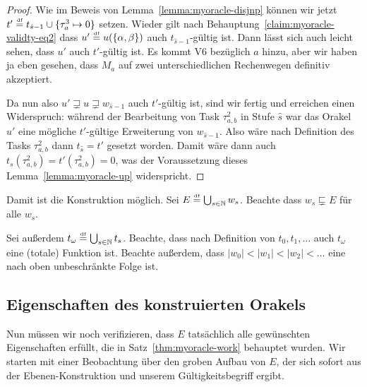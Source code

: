 \begin{proof}
Wie im Beweis von Lemma~\ref{lemma:myoracle-disjnp} können wir jetzt $t'\stackrel{\text{\smash{\tiny df}}}{=} t_{\hat{s}-1}\cup\{\tau^3_{a} \mapsto 0\}$ setzen.
Wieder gilt nach Behauptung~\ref{claim:myoracle-validty-eq2} dass $u'\stackrel{\text{\smash{\tiny df}}}{=} u(\{\alpha, \beta\})$ auch $t_{\hat{s}-1}$-gültig ist.
Dann lässt sich auch leicht sehen, dass $u'$ auch $t'$-gültig ist. Es kommt V6 bezüglich $a$ hinzu, aber wir haben ja eben gesehen, dass $M_a$ auf zwei unterschiedlichen Rechenwegen definitiv akzeptiert.

Da nun also $u'\sqsupsetneq u \sqsupsetneq w_{\hat{s}-1}$ auch $t'$-gültig ist, sind wir fertig und erreichen einen Widerspruch: während der Bearbeitung von Task $\tau^2_{a,b}$ in Stufe $\hat{s}$ war das Orakel $u'$ eine mögliche $t'$-gültige Erweiterung von $w_{\hat{s}-1}$. Also wäre nach Definition des Tasks $\tau^2_{a,b}$ dann $t_{\hat{s}}=t'$ gesetzt worden.
Damit wäre dann auch $t_{s}(\tau^2_{a,b})=t'(\tau^2_{a,b})=0$, was der Voraussetzung dieses Lemma~\ref{lemma:myoracle-up} widerspricht.
\end{proof}

Damit ist die Konstruktion möglich. Sei $E\stackrel{\text{\smash{\tiny df}}}{=} \bigcup_{s\in\mathbb N} w_s$.
Beachte dass $w_s\sqsubsetneq E$ für alle $w_s$.

Sei außerdem $t_\omega \stackrel{\text{\smash{\tiny df}}}{=} \bigcup_{s\in\mathbb N} t_s$. Beachte, dass nach Definition von $t_0, t_1, \dots$ auch $t_\omega$ eine (totale) Funktion ist.
Beachte außerdem, dass $|w_0|<|w_1|< |w_2|< \ldots$ eine nach oben unbeschränkte Folge ist.

\subsection*{Eigenschaften des konstruierten Orakels}

Nun müssen wir noch verifizieren, dass $E$ tatsächlich alle gewünschten Eigenschaften erfüllt, die in Satz~\ref{thm:myoracle-work} behauptet wurden.
Wir starten mit einer Beobachtung über den groben Aufbau von $E$, der sich sofort aus der Ebenen-Konstruktion und unserem Gültigkeitsbegriff ergibt.

